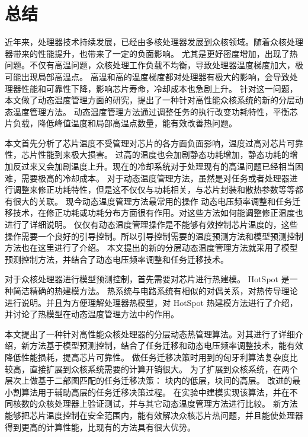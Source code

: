 
\chapter{总结}

近年来，处理器技术持续发展，已经由多核处理器发展到众核领域。随着众核处理器带来的性能提升，也带来了一定的负面影响。
尤其是更好密度增加，出现了热问题。不仅有高温问题，众核处理工作负载不均衡，导致处理器温度梯度加大，极可能出现局部高温点。
高温和高的温度梯度都对处理器有极大的影响，会导致处理器性能和可靠性下降，影响芯片寿命，冷却成本也急剧上升。
针对这一问题，本文做了动态温度管理方面的研究，提出了一种针对高性能众核系统的新的分层动态温度管理方法。
动态温度管理方法通过调整任务的执行改变功耗特性，平衡芯片负载，降低峰值温度和局部高温点数量，能有效改善热问题。

本文首先分析了芯片温度不受管理对芯片的各方面负面影响，温度过高对芯片可靠性，芯片性能到来极大损害。
过高的温度也会加剧静态功耗增加，静态功耗的增加反过来又会加剧温度上升。现在的冷却系统对于处理现有的高温问题已经相当困难，需要极高的冷却成本。
对于动态温度管理方法，虽然是对任务或者处理器进行调整来修正功耗特性，但是这不仅仅与功耗相关，与芯片封装和散热参数等等都有很大的关联。
现今动态温度管理方法最常用的操作 动态电压频率调整和任务迁移技术，在修正功耗或功耗分布方面很有作用。对这些方法如何能调整修正温度也进行了详细说明。
仅仅有动态温度管理操作是不能够有效控制芯片温度的，这些操作需要一个良好的引导控制。所以引导控制需要的温度预测方法和模型预测控制方法也在这里进行了介绍。
本文提出的新的分层动态温度管理方法就采用了模型预测控制方法，并结合了动态电压频率调整和任务迁移技术。

对于众核处理器进行模型预测控制，首先需要对芯片进行热建模。 HotSpot 是一种简洁精确的热建模方法。
热系统与电路系统有相似的对偶关系，对热传导理论进行说明。并且为方便理解处理器热模型，对 HotSpot 热建模方法进行了介绍，
并讨论了热模型在动态温度管理方法中的作用。

本文提出了一种针对高性能众核处理器的分层动态热管理算法。对其进行了详细介绍，新方法基于模型预测控制，结合了任务迁移和动态电压频率调整技术，能有效降低性能损耗，提高芯片可靠性。
做任务迁移决策时用到的匈牙利算法复杂度比较高，直接扩展到众核系统需要的计算开销很大。
为了扩展到众核系统，在两个层次上做基于二部图匹配的任务迁移决策：
块内的低层，块间的高层。
改进的最小割算法用于辅助高层的任务迁移决策过程。
在实验中建模实现该算法，并在不同核数的众核处理器上验证测试，并与其它动态温度管理方法进行比较。
新方法能够把芯片温度控制在安全范围内，能有效解决众核芯片热问题，并且能使处理器得到更高的计算性能，比现有的方法具有很大优势。






























